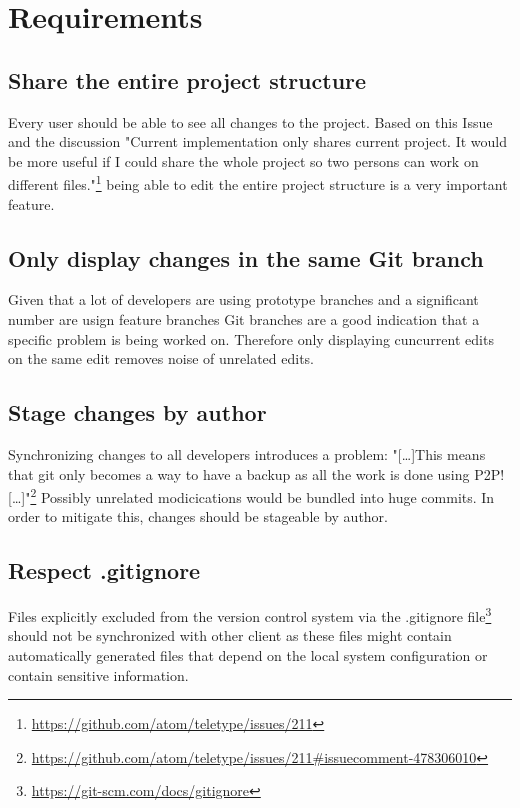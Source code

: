 \chapter{Requirements}

\section{Share the entire project structure}

Every user should be able to see all changes to the project.
Based on this Issue and the discussion "Current implementation only shares current project. It would be more useful if I could share the whole project so two persons can work on different files."\footnote{\href{https://github.com/atom/teletype/issues/211}{https://github.com/atom/teletype/issues/211}} being able to edit the entire project structure is a very important feature.

\section{Only display changes in the same Git branch}

Given that a lot of developers are using prototype branches and a significant number are usign feature branches Git branches are a good indication that a specific problem is being worked on.\cite{PhillipsSillitoWalker:2011:Branching_and_merging} Therefore only displaying cuncurrent edits on the same edit removes noise of unrelated edits.

\section{Stage changes by author}

Synchronizing changes to all developers introduces a problem:
"[\dots]This means that git only becomes a way to have a backup as all the work is done using P2P! [\dots]"\footnote{\href{https://github.com/atom/teletype/issues/211\#issuecomment-478306010}{https://github.com/atom/teletype/issues/211\#issuecomment-478306010}}
Possibly unrelated modicications would be bundled into huge commits. In order to mitigate this, changes should be stageable by author.

\section{Respect .gitignore}

Files explicitly excluded from the version control system via the .gitignore file\footnote{\href{https://git-scm.com/docs/gitignore}{https://git-scm.com/docs/gitignore}} should not be synchronized with other client as these files might contain automatically generated files that depend on the local system configuration or contain sensitive information.

